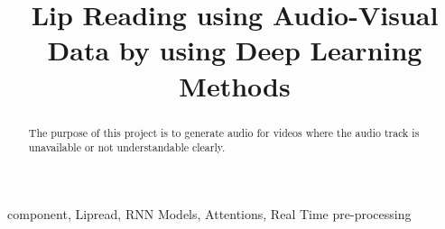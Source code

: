 \documentclass[conference]{IEEEtran}
\begin{document}
\title{Lip Reading using Audio-Visual Data by using Deep Learning Methods
\\
}

\author{
\and
{}
\and
{}
\and
{}
\and

}

\maketitle

\begin{abstract}
The purpose of this project is to generate audio for videos where the audio track is unavailable or not understandable clearly.
\end{abstract}

\begin{IEEEkeywords}
component, Lipread, RNN Models, Attentions, Real Time pre-processing 
\end{IEEEkeywords}
\end{document}
